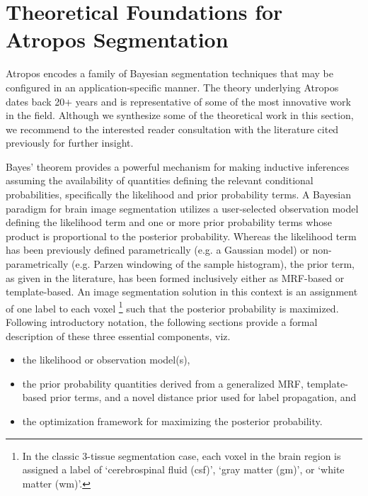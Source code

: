 \documentclass[11pt,english]{article}
\begin{document}


\section{Theoretical Foundations for Atropos Segmentation} 

Atropos encodes a family of Bayesian segmentation techniques that may be configured in an application-specific manner.  The theory underlying Atropos dates back 20$+$ years and is representative of some of the most innovative work in the field.  Although we synthesize some of the theoretical work in this section, we recommend to the interested reader consultation with the literature cited previously for further insight.

Bayes' theorem provides a powerful mechanism for making inductive inferences assuming the availability of quantities defining the relevant conditional probabilities, specifically the likelihood and prior probability terms.  A Bayesian paradigm for brain image segmentation utilizes a user-selected observation model defining the likelihood term and one or more prior probability terms whose product is proportional to the posterior probability.  Whereas the likelihood term has been previously defined parametrically (e.g. a Gaussian model) or non-parametrically (e.g. Parzen windowing of the sample histogram), the prior term, as given in the literature, has been formed inclusively either as MRF-based or template-based.  An image segmentation solution in this context is an assignment of one label to each voxel%
\footnote{
In the classic 3-tissue segmentation case, each voxel in the brain region is assigned a label of `cerebrospinal fluid (csf)', `gray matter (gm)', or `white matter (wm)'. 
}
such that the posterior probability is maximized.  Following introductory notation, the following sections provide a formal description of these three essential components, viz.
\begin{itemize}
  \item the likelihood or observation model(s),
  \item the prior probability quantities derived from a generalized MRF, template-based prior terms, and a novel distance prior used for label propagation, and 
  \item the optimization framework for maximizing the posterior probability.
\end{itemize}
\end{document}
